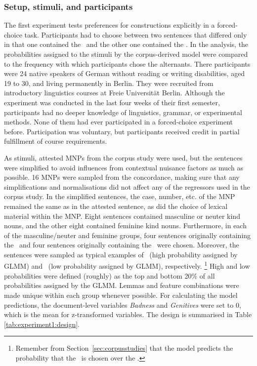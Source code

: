 \subsubsection{Setup, stimuli, and participants}

The first experiment tests preferences for constructions explicitly in a forced-choice task.
Participants had to choose between two sentences that differed only in that one contained the \NACa\, and the other one contained the \PGCa.
In the analysis, the probabilities assigned to the stimuli by the corpus-derived model were compared to the frequency with which participants chose the alternants.
There participants were 24 native speakers of German without reading or writing disabilities, aged 19 to 30, and living permanently in Berlin.
They were recruited from introductory linguistics courses at Freie Universität Berlin.
Although the experiment was conducted in the last four weeks of their first semester, participants had no deeper knowledge of linguistics, grammar, or experimental methods.
None of them had ever participated in a forced-choice experiment before.
Participation was voluntary, but participants received credit in partial fulfillment of course requirements.

As stimuli, attested MNPs from the corpus study were used, but the sentences were simplified to avoid influences from contextual nuisance factors as much as possible.
16 MNPs were sampled from the concordance, making sure that any simplifications and normalisations did not affect any of the regressors used in the corpus study.
In the simplified sentences, the case, number, etc. of the MNP remained the same as in the attested sentence, as did the choice of lexical material within the MNP.
Eight sentences contained masculine or neuter kind nouns, and the other eight contained feminine kind nouns.
Furthermore, in each of the masculine\slash neuter and feminine groups, four sentences originally containing the \NACa\ and four sentences originally containing the \PGCa\ were chosen.
Moreover, the sentences were sampled as typical examples of \PGCa\ (high probability assigned by GLMM) and \NACa\ (low probability assigned by GLMM), respectively.%
\footnote{Remember from Section~\ref{sec:corpusstudies} that the model predicts the probability that the \PGCa\ is chosen over the \NACa.}
High and low probabilities were defined (roughly) as the top and bottom 20\% of all probabilities assigned by the GLMM.
Lemmas and feature combinations were made unique within each group whenever possible.
For calculating the model predictions, the document-level variables \textit{Badness} and \textit{Genitives} were set to 0, which is the mean for z-transformed variables.
The design is summarised in Table \ref{tab:experiment1:design}.

